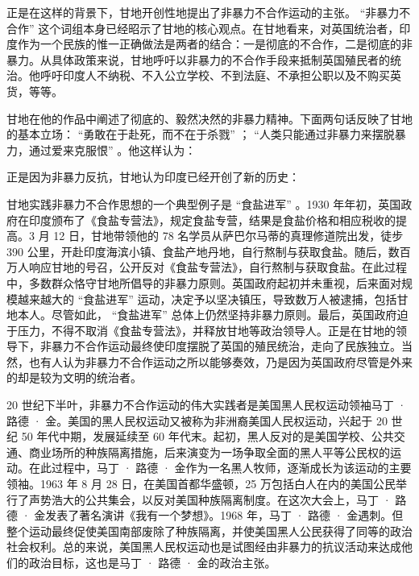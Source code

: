 正是在这样的背景下，甘地开创性地提出了非暴力不合作运动的主张。 “非暴力不合作” 这个词组本身已经昭示了甘地的核心观点。在甘地看来，对英国统治者，印度作为一个民族的惟一正确做法是两者的结合：一是彻底的不合作，二是彻底的非暴力。从具体政策来说，甘地呼吁以非暴力的不合作手段来抵制英国殖民者的统治。他呼吁印度人不纳税、不入公立学校、不到法庭、不承担公职以及不购买英货，等等。

甘地在他的作品中阐述了彻底的、毅然决然的非暴力精神。下面两句话反映了甘地的基本立场： “勇敢在于赴死，而不在于杀戮” ； “人类只能通过非暴力来摆脱暴力，通过爱来克服恨” 。他这样认为：


正是因为非暴力反抗，甘地认为印度已经开创了新的历史：


甘地实践非暴力不合作思想的一个典型例子是 “食盐进军” 。1930 年年初，英国政府在印度颁布了《食盐专营法》，规定食盐专营，结果是食盐价格和相应税收的提高。3 月 12 日，甘地带领他的 78 名学员从萨巴尔马蒂的真理修道院出发，徒步 390 公里，开赴印度海滨小镇、食盐产地丹地，自行熬制与获取食盐。随后，数百万人响应甘地的号召，公开反对《食盐专营法》，自行熬制与获取食盐。在此过程中，多数群众恪守甘地所倡导的非暴力原则。英国政府起初并未重视，后来面对规模越来越大的 “食盐进军” 运动，决定予以坚决镇压，导致数万人被逮捕，包括甘地本人。尽管如此， “食盐进军” 总体上仍然坚持非暴力原则。最后，英国政府迫于压力，不得不取消《食盐专营法》，并释放甘地等政治领导人。正是在甘地的领导下，非暴力不合作运动最终使印度摆脱了英国的殖民统治，走向了民族独立。当然，也有人认为非暴力不合作运动之所以能够奏效，乃是因为英国政府尽管是外来的却是较为文明的统治者。

20 世纪下半叶，非暴力不合作运动的伟大实践者是美国黑人民权运动领袖马丁 · 路德 · 金。美国的黑人民权运动又被称为非洲裔美国人民权运动，兴起于 20 世纪 50 年代中期，发展延续至 60 年代末。起初，黑人反对的是美国学校、公共交通、商业场所的种族隔离措施，后来演变为一场争取全面的黑人平等公民权的运动。在此过程中，马丁 · 路德 · 金作为一名黑人牧师，逐渐成长为该运动的主要领袖。1963 年 8 月 28 日，在美国首都华盛顿，25 万包括白人在内的美国公民举行了声势浩大的公共集会，以反对美国种族隔离制度。在这次大会上，马丁 · 路德 · 金发表了著名演讲《我有一个梦想》。1968 年，马丁 · 路德 · 金遇刺。但整个运动最终促使美国南部废除了种族隔离，并使美国黑人公民获得了同等的政治社会权利。总的来说，美国黑人民权运动也是试图经由非暴力的抗议活动来达成他们的政治目标，这也是马丁 · 路德 · 金的政治主张。

